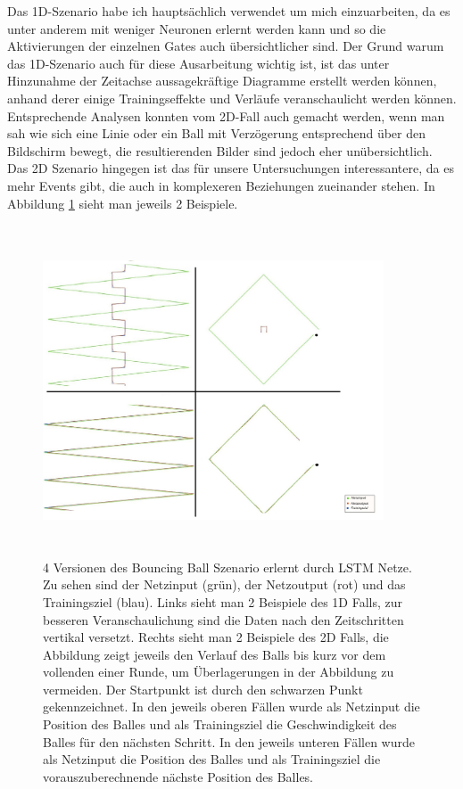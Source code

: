 Das 1D-Szenario habe ich hauptsächlich verwendet um mich einzuarbeiten, da es unter anderem mit weniger Neuronen erlernt werden kann und so die Aktivierungen der einzelnen Gates auch übersichtlicher sind. Der Grund warum das 1D-Szenario auch für diese Ausarbeitung wichtig ist, ist das unter Hinzunahme der Zeitachse aussagekräftige Diagramme erstellt werden können, anhand derer einige Trainingseffekte und Verläufe veranschaulicht werden können. Entsprechende Analysen konnten vom 2D-Fall auch gemacht werden, wenn man sah wie sich eine Linie oder ein Ball mit Verzögerung entsprechend über den Bildschirm bewegt, die resultierenden Bilder sind jedoch eher unübersichtlich. Das 2D Szenario hingegen ist das für unsere Untersuchungen interessantere, da es mehr Events gibt, die auch in komplexeren Beziehungen zueinander stehen. In Abbildung \ref{img:1dvs2d} sieht man jeweils 2 Beispiele.
\begin{figure}
	\centering
	\includegraphics[width=0.9\textwidth, height=370px]{pics/1dvs2d.jpg}	
	\caption{4 Versionen des Bouncing Ball Szenario erlernt durch LSTM Netze. Zu sehen sind der Netzinput (grün), der Netzoutput (rot) und das Trainingsziel (blau). Links sieht man 2 Beispiele des 1D Falls, zur besseren Veranschaulichung sind die Daten nach den Zeitschritten vertikal versetzt. Rechts sieht man 2 Beispiele des 2D Falls, die Abbildung zeigt jeweils den Verlauf des Balls bis kurz vor dem vollenden einer Runde, um Überlagerungen in der Abbildung zu vermeiden. Der Startpunkt ist durch den schwarzen Punkt gekennzeichnet. In den jeweils oberen Fällen wurde als Netzinput die Position des Balles und als Trainingsziel die Geschwindigkeit des Balles für den nächsten Schritt. In den jeweils unteren Fällen wurde als Netzinput die Position des Balles und als Trainingsziel die vorauszuberechnende nächste Position des Balles.}
	\label{img:1dvs2d}
\end{figure}

